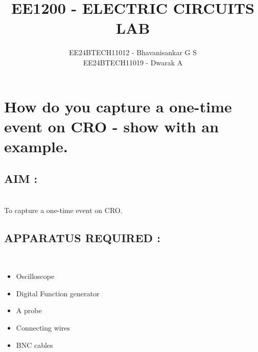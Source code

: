 \documentclass[report]{IEEEtran}
\begin{document}

\vspace{3cm}

\title{EE1200 - ELECTRIC CIRCUITS LAB}
\author{EE24BTECH11012 - Bhavanisankar G S \\ EE24BTECH11019 - Dwarak A}
{\let\newpage\relax\maketitle}

\renewcommand{\thefigure}{\theenumi}
\renewcommand{\thetable}{\theenumi}
\setlength{\intextsep}{10pt} %


\renewcommand{\thetable}{\theenumi}

\section{How do you capture a one-time event on CRO - show with an example.}

\subsection{AIM : } \\
To capture a one-time event on CRO.

\subsection{APPARATUS REQUIRED : } \\
\begin{itemize}
	\item Oscilloscope
	\item Digital Function generator
	\item A probe
	\item Connecting wires
	\item BNC cables
\end{itemize}
\end{document}
